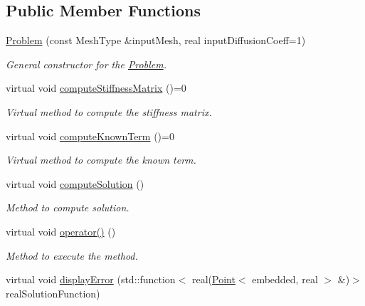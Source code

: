 \subsection*{Public Member Functions}
\begin{DoxyCompactItemize}
\item 
\hyperlink{class_problem_a0f93be343a3bc42c319a3f6e43eb86c4}{Problem} (const Mesh\+Type \&input\+Mesh, real input\+Diffusion\+Coeff=1)
\begin{DoxyCompactList}\small\item\em General constructor for the \hyperlink{class_problem}{Problem}. \end{DoxyCompactList}\item 
virtual void \hyperlink{class_problem_a20ac3262ba227f49ff1e1b9765079d59}{compute\+Stiffness\+Matrix} ()=0\hypertarget{class_problem_a20ac3262ba227f49ff1e1b9765079d59}{}\label{class_problem_a20ac3262ba227f49ff1e1b9765079d59}

\begin{DoxyCompactList}\small\item\em Virtual method to compute the stiffness matrix. \end{DoxyCompactList}\item 
virtual void \hyperlink{class_problem_abb49b032c2cd29ed90a1966e3a7a8765}{compute\+Known\+Term} ()=0\hypertarget{class_problem_abb49b032c2cd29ed90a1966e3a7a8765}{}\label{class_problem_abb49b032c2cd29ed90a1966e3a7a8765}

\begin{DoxyCompactList}\small\item\em Virtual method to compute the known term. \end{DoxyCompactList}\item 
virtual void \hyperlink{class_problem_a0eabd7cfaf0b183da21f7246e50abbea}{compute\+Solution} ()\hypertarget{class_problem_a0eabd7cfaf0b183da21f7246e50abbea}{}\label{class_problem_a0eabd7cfaf0b183da21f7246e50abbea}

\begin{DoxyCompactList}\small\item\em Method to compute solution. \end{DoxyCompactList}\item 
virtual void \hyperlink{class_problem_a9fd9a722387afd56922d0327ead502bf}{operator()} ()\hypertarget{class_problem_a9fd9a722387afd56922d0327ead502bf}{}\label{class_problem_a9fd9a722387afd56922d0327ead502bf}

\begin{DoxyCompactList}\small\item\em Method to execute the method. \end{DoxyCompactList}\item 
virtual void \hyperlink{class_problem_a26a9288abd12658a65b26f0a0e42fca5}{display\+Error} (std\+::function$<$ real(\hyperlink{class_point}{Point}$<$ embedded, real $>$ \&)$>$ real\+Solution\+Function)\hypertarget{class_problem_a26a9288abd12658a65b26f0a0e42fca5}{}\label{class_problem_a26a9288abd12658a65b26f0a0e42fca5}


\end{DoxyCompactItemize}
